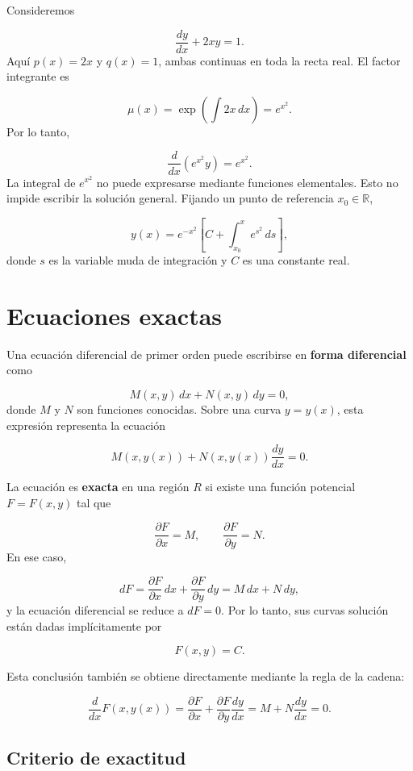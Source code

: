 \documentclass[12pt,a4paper]{article}
\begin{document}
	Consideremos

	\[
	\frac{dy}{dx}+2xy=1.
	\]
	Aquí \(p(x)=2x\) y \(q(x)=1\), ambas continuas en toda la recta real. El factor integrante es

	\[
	\mu(x)=\exp\left(\int 2x\,dx\right)=e^{x^2}.
	\]
	Por lo tanto,

	\[
	\frac{d}{dx}\left(e^{x^2}y\right)=e^{x^2}.
	\]
	La integral de \(e^{x^2}\) no puede expresarse mediante funciones elementales. Esto no impide escribir la solución general. Fijando un punto de referencia \(x_0\in\mathbb{R}\),

	\[
	\boxed{
	y(x)
	=
	e^{-x^2}
	\left[
	C+\int_{x_0}^{x}e^{s^2}\,ds
	\right],
	}
	\]
	donde \(s\) es la variable muda de integración y \(C\) es una constante real.

	\clearpage
	\section{Ecuaciones exactas}

	Una ecuación diferencial de primer orden puede escribirse en \textbf{forma diferencial} como

	\[
	M(x,y)\,dx+N(x,y)\,dy=0,
	\]
	donde \(M\) y \(N\) son funciones conocidas. Sobre una curva \(y=y(x)\), esta expresión representa la ecuación

	\[
	M(x,y(x))+N(x,y(x))\frac{dy}{dx}=0.
	\]

	La ecuación es \textbf{exacta} en una región \(R\) si existe una función potencial \(F=F(x,y)\) tal que

	\[
	\frac{\partial F}{\partial x}=M,
	\qquad
	\frac{\partial F}{\partial y}=N.
	\]
	En ese caso,

	\[
	dF
	=
	\frac{\partial F}{\partial x}\,dx
	+
	\frac{\partial F}{\partial y}\,dy
	=
	M\,dx+N\,dy,
	\]
	y la ecuación diferencial se reduce a \(dF=0\). Por lo tanto, sus curvas solución están dadas implícitamente por

	\[
	\boxed{F(x,y)=C.}
	\]

	Esta conclusión también se obtiene directamente mediante la regla de la cadena:

	\[
	\frac{d}{dx}F(x,y(x))
	=
	\frac{\partial F}{\partial x}
	+
	\frac{\partial F}{\partial y}\frac{dy}{dx}
	=
	M+N\frac{dy}{dx}
	=
	0.
	\]

	\subsection{Criterio de exactitud}
\end{document}
